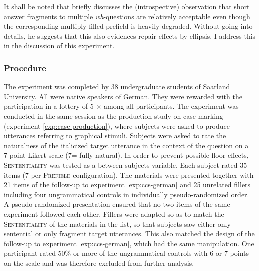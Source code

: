 It shall be noted that \citet[710--711]{merchant2004} briefly discusses the (introspective) observation that short answer fragments to multiple \textit{wh}-questions are relatively acceptable even though the corresponding multiply filled prefield is heavily degraded. Without going into details, he suggests that this also evidences repair effects by ellipsis. I address this in the discussion of this experiment.

\subsubsection{Procedure}
The experiment was completed by 38 undergraduate students of Saarland University. All were native speakers of German. They were rewarded with the participation in a lottery of 5 $\times$  among all participants. The experiment was conducted in the same session as the production study on case marking (experiment \ref{exp:case-production}), where subjects were asked to produce utterances referring to graphical stimuli. Subjects were asked to rate the naturalness of the italicized target utterance in the context of the question on a 7-point Likert scale (7= fully natural). In order to prevent possible floor effects, \textsc{Sententiality} was tested as a between subjects variable. Each subject rated 35 items (7 per \textsc{Prefield} configuration). The materials were presented together with 21 items of the follow-up to experiment \ref{exp:ccs-german} and 25 unrelated fillers including four ungrammatical controls in individually pseudo-randomized order. A pseudo-randomized presentation ensured that no two items of the same experiment followed each other. Fillers were adapted so as to match the \textsc{Sententiality} of the materials in the list, so that subjects saw either only sentential or only fragment target utterances. This also matched the design of the follow-up to experiment \ref{exp:ccs-german}, which had the same manipulation. One participant rated 50\% or more of the ungrammatical controls with 6 or 7 points on the scale and was therefore excluded from further analysis. 

